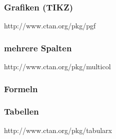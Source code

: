 \subsubsection{Grafiken (TIKZ)}
http://www.ctan.org/pkg/pgf

\subsubsection{mehrere Spalten}
http://www.ctan.org/pkg/multicol


\subsubsection{Formeln}
\subsubsection{Tabellen}
http://www.ctan.org/pkg/tabularx